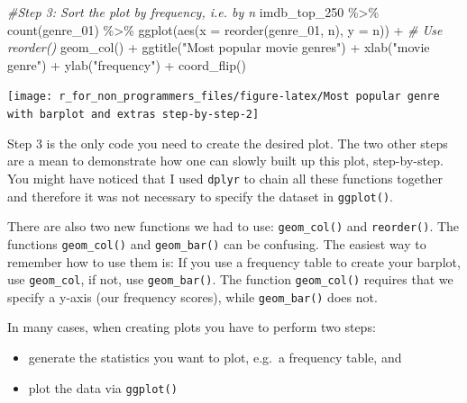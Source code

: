 \documentclass[
]{book}
\newenvironment{Shaded}{\begin{snugshade}}{\end{snugshade}}
\newcommand{\AttributeTok}[1]{\textcolor[rgb]{0.77,0.63,0.00}{#1}}
\newcommand{\CommentTok}[1]{\textcolor[rgb]{0.56,0.35,0.01}{\textit{#1}}}
\newcommand{\FunctionTok}[1]{\textcolor[rgb]{0.00,0.00,0.00}{#1}}
\newcommand{\NormalTok}[1]{#1}
\newcommand{\SpecialCharTok}[1]{\textcolor[rgb]{0.00,0.00,0.00}{#1}}
\newcommand{\StringTok}[1]{\textcolor[rgb]{0.31,0.60,0.02}{#1}}
\begin{document}
\begin{Shaded}
\begin{Highlighting}[]

\CommentTok{\#Step 3: Sort the plot by frequency, i.e. by \textquotesingle{}n\textquotesingle{}}
\NormalTok{imdb\_top\_250 }\SpecialCharTok{\%\textgreater{}\%} 
  \FunctionTok{count}\NormalTok{(genre\_01) }\SpecialCharTok{\%\textgreater{}\%} 
  \FunctionTok{ggplot}\NormalTok{(}\FunctionTok{aes}\NormalTok{(}\AttributeTok{x =} \FunctionTok{reorder}\NormalTok{(genre\_01, n), }\AttributeTok{y =}\NormalTok{ n)) }\SpecialCharTok{+}    \CommentTok{\# Use \textquotesingle{}reorder()\textquotesingle{}}
  \FunctionTok{geom\_col}\NormalTok{() }\SpecialCharTok{+}
  \FunctionTok{ggtitle}\NormalTok{(}\StringTok{"Most popular movie genres"}\NormalTok{) }\SpecialCharTok{+}
  \FunctionTok{xlab}\NormalTok{(}\StringTok{"movie genre"}\NormalTok{) }\SpecialCharTok{+}
  \FunctionTok{ylab}\NormalTok{(}\StringTok{"frequency"}\NormalTok{) }\SpecialCharTok{+}
  \FunctionTok{coord\_flip}\NormalTok{()}
\end{Highlighting}
\end{Shaded}

\begin{center}\texttt{[image: r\_for\_non\_programmers\_files/figure-latex/Most popular genre with barplot and extras step-by-step-2]} \end{center}

Step 3 is the only code you need to create the desired plot. The two other steps are a mean to demonstrate how one can slowly built up this plot, step-by-step. You might have noticed that I used \texttt{dplyr} to chain all these functions together and therefore it was not necessary to specify the dataset in \texttt{ggplot()}.

There are also two new functions we had to use: \texttt{geom\_col()} and \texttt{reorder()}. The functions \texttt{geom\_col()} and \texttt{geom\_bar()} can be confusing. The easiest way to remember how to use them is: If you use a frequency table to create your barplot, use \texttt{geom\_col}, if not, use \texttt{geom\_bar()}. The function \texttt{geom\_col()} requires that we specify a y-axis (our frequency scores), while \texttt{geom\_bar()} does not.

In many cases, when creating plots you have to perform two steps:

\begin{itemize}
\item
  generate the statistics you want to plot, e.g.~a frequency table, and
\item
  plot the data via \texttt{ggplot()}
\end{itemize}
\end{document}
